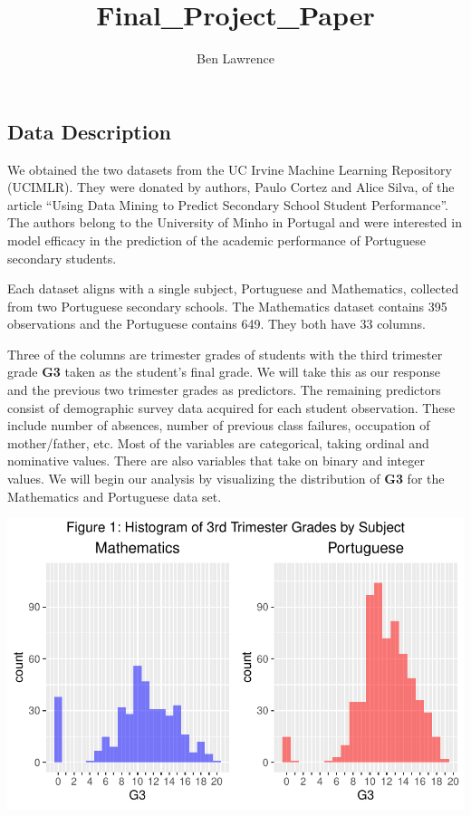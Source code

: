 \documentclass[
  letterpaper,
  DIV=11,
  numbers=noendperiod]{scrartcl}
\title{Final\_Project\_Paper}
\author{Ben Lawrence}
\date{}
\begin{document}
\maketitle

\subsection{Data Description}\label{data-description}

We obtained the two datasets from the UC Irvine Machine Learning
Repository (UCIMLR). They were donated by authors, Paulo Cortez and
Alice Silva, of the article ``Using Data Mining to Predict Secondary
School Student Performance''. The authors belong to the University of
Minho in Portugal and were interested in model efficacy in the
prediction of the academic performance of Portuguese secondary
students.~

Each dataset aligns with a single subject, Portuguese and Mathematics,
collected from two Portuguese secondary schools. The Mathematics dataset
contains 395 observations and the Portuguese contains 649. They both
have 33 columns.~~

\hfill\break
Three of the columns are trimester grades of students with the third
trimester grade \textbf{G3} taken as the student's final grade. We will
take this as our response and the previous two trimester grades as
predictors. The remaining predictors consist of demographic survey data
acquired for each student observation. These include number of absences,
number of previous class failures, occupation of mother/father, etc.
Most of the variables are categorical, taking ordinal and nominative
values. There are also variables that take on binary and integer values.
We will begin our analysis by visualizing the distribution of
\textbf{G3} for the Mathematics and Portuguese data set.~

\includegraphics{Final_Paper_edit_files/figure-pdf/unnamed-chunk-1-1.pdf}
\end{document}
